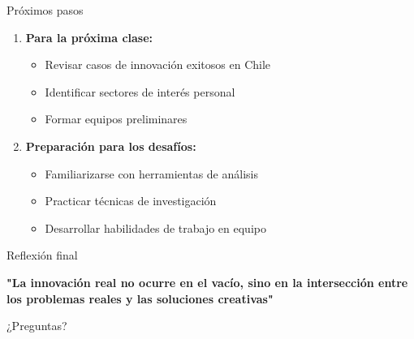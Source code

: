 \documentclass[10pt]{beamer}
\begin{document}
\begin{frame}{Próximos pasos}
    \begin{enumerate}
        \item \textbf{Para la próxima clase:}
        \begin{itemize}
            \item Revisar casos de innovación exitosos en Chile
            \item Identificar sectores de interés personal
            \item Formar equipos preliminares
        \end{itemize}
        
        \item \textbf{Preparación para los desafíos:}
        \begin{itemize}
            \item Familiarizarse con herramientas de análisis
            \item Practicar técnicas de investigación
            \item Desarrollar habilidades de trabajo en equipo
        \end{itemize}
    \end{enumerate}
\end{frame}

\begin{frame}{Reflexión final}
    \begin{center}
    \large{\textbf{"La innovación real no ocurre en el vacío, sino en la intersección entre los problemas reales y las soluciones creativas"}}
    \end{center}
    
    \vspace{1cm}
    ¿Preguntas?
\end{frame}
\end{document}
